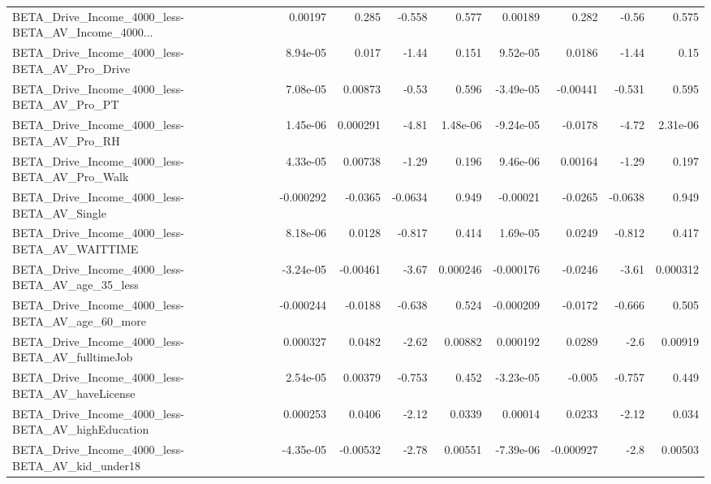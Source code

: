 \begin{tabular}{lrrrrrrrr}
BETA\_Drive\_Income\_4000\_less-BETA\_AV\_Income\_4000... &     0.00197 &        0.285 &    -0.558 &    0.577 &    0.00189 &       0.282 &        -0.56 &         0.575 \\
BETA\_Drive\_Income\_4000\_less-BETA\_AV\_Pro\_Drive      &    8.94e-05 &        0.017 &     -1.44 &    0.151 &   9.52e-05 &      0.0186 &        -1.44 &          0.15 \\
BETA\_Drive\_Income\_4000\_less-BETA\_AV\_Pro\_PT         &    7.08e-05 &      0.00873 &     -0.53 &    0.596 &  -3.49e-05 &    -0.00441 &       -0.531 &         0.595 \\
BETA\_Drive\_Income\_4000\_less-BETA\_AV\_Pro\_RH         &    1.45e-06 &     0.000291 &     -4.81 & 1.48e-06 &  -9.24e-05 &     -0.0178 &        -4.72 &      2.31e-06 \\
BETA\_Drive\_Income\_4000\_less-BETA\_AV\_Pro\_Walk       &    4.33e-05 &      0.00738 &     -1.29 &    0.196 &   9.46e-06 &     0.00164 &        -1.29 &         0.197 \\
BETA\_Drive\_Income\_4000\_less-BETA\_AV\_Single         &   -0.000292 &      -0.0365 &   -0.0634 &    0.949 &   -0.00021 &     -0.0265 &      -0.0638 &         0.949 \\
BETA\_Drive\_Income\_4000\_less-BETA\_AV\_WAITTIME       &    8.18e-06 &       0.0128 &    -0.817 &    0.414 &   1.69e-05 &      0.0249 &       -0.812 &         0.417 \\
BETA\_Drive\_Income\_4000\_less-BETA\_AV\_age\_35\_less    &   -3.24e-05 &     -0.00461 &     -3.67 & 0.000246 &  -0.000176 &     -0.0246 &        -3.61 &      0.000312 \\
BETA\_Drive\_Income\_4000\_less-BETA\_AV\_age\_60\_more    &   -0.000244 &      -0.0188 &    -0.638 &    0.524 &  -0.000209 &     -0.0172 &       -0.666 &         0.505 \\
BETA\_Drive\_Income\_4000\_less-BETA\_AV\_fulltimeJob    &    0.000327 &       0.0482 &     -2.62 &  0.00882 &   0.000192 &      0.0289 &         -2.6 &       0.00919 \\
BETA\_Drive\_Income\_4000\_less-BETA\_AV\_haveLicense    &    2.54e-05 &      0.00379 &    -0.753 &    0.452 &  -3.23e-05 &      -0.005 &       -0.757 &         0.449 \\
BETA\_Drive\_Income\_4000\_less-BETA\_AV\_highEducation  &    0.000253 &       0.0406 &     -2.12 &   0.0339 &    0.00014 &      0.0233 &        -2.12 &         0.034 \\
BETA\_Drive\_Income\_4000\_less-BETA\_AV\_kid\_under18    &   -4.35e-05 &     -0.00532 &     -2.78 &  0.00551 &  -7.39e-06 &   -0.000927 &         -2.8 &       0.00503 \\

\end{tabular}
